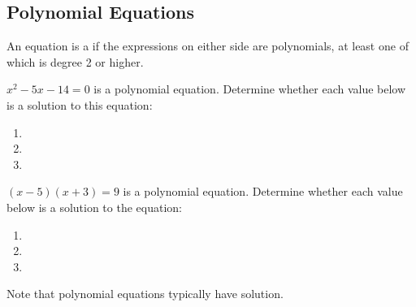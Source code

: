 \subsection{Polynomial Equations} 
\begin{definition}
An equation is a  if the expressions on either side are polynomials, at least one of which is degree 2 or higher.
\end{definition}
\begin{Example}
$x^2-5x-14=0$ is a polynomial equation. Determine whether each value below is a solution to this equation:
\begin{enumerate}\setabc
\item{}
\item{}
\item{}
\end{enumerate}
\end{Example}
\begin{Example}
$(x-5)(x+3)=9$ is a polynomial equation. Determine whether each value below is a solution to the equation:
\begin{enumerate}\setabc
\item{}
\item{}
\item{}
\end{enumerate}
\end{Example}
\noi Note that polynomial equations typically have \makeblank solution.